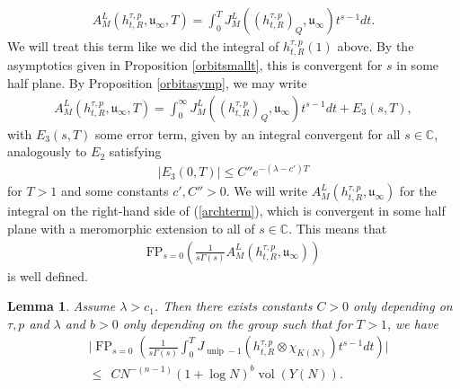 \documentclass[11pt,reqno]{amsart}
\numberwithin{equation}{section}
\newtheorem{lem}[thm]{Lemma}
\theoremstyle{definition}
\theoremstyle{remark}
\newcommand{\vol}{\operatorname{vol}}
\newcommand{\unip}{\operatorname{unip}}
\newcommand{\FP}{\operatorname{FP}}
\newcommand{\mf}[1]{\mathfrak{#1}}
\newcommand{\C}{\mathbb{C}}
\begin{document}
\begin{align*}
    A_M^{L}(h^{\tau,p}_{t,R},\mf{u}_\infty,T) = \int_0^T J^L_M((h^{\tau,p}_{t,R})_Q,\mf{u}_\infty)t^{s-1}dt.
\end{align*}
We will treat this term like we did the integral of $h^{\tau,p}_{t,R}(1)$ above. By the asymptotics given in Proposition \ref{orbitsmallt}, this is convergent for $s$ in some half plane. By Proposition \ref{orbitasymp}, we may write
\begin{align}\label{archterm}
    A_M^{L}(h^{\tau,p}_{t,R},\mf{u}_\infty,T) = \int_0^\infty J^L_M((h^{\tau,p}_{t,R})_Q,\mf{u}_\infty)t^{s-1}dt+E_3(s,T),
\end{align}
with $E_3(s,T)$ some error term, given by an integral convergent for all $s\in\C$, analogously to $E_2$ satisfying
\begin{align}\label{error3}
    |E_3(0,T)|\leq C'' e^{-(\lambda-c') T} 
\end{align}
for $T> 1$ and some constants $c',C''>0$. We will write $A_M^{L}(h^{\tau,p}_{t,R},\mf{u}_\infty)$ for the integral on the right-hand side of (\ref{archterm}), which is convergent in some half plane with a meromorphic extension to all of $s\in\C$. This means that
\begin{align*}
    \text{FP}_{s=0}\left(\frac{1}{s\Gamma(s)}A_M^{L}(h^{\tau,p}_{t,R},\mf{u}_\infty)\right)
\end{align*}
is well defined. 
\begin{lem}\label{unip-1bound}
    Assume $\lambda > c_1$. Then there exists constants $C>0$ only depending on $\tau,p$ and $\lambda$ and $b>0$ only depending on the group such that for $T> 1$, we have
    \begin{align*}
    &\Bigg\vert\FP_{s=0}\left(\frac{1}{s\Gamma(s)}\int_0^T J_{\unip-1}(h^{\tau,p}_{t,R}\otimes \chi_{K(N)})t^{s-1}dt\right)\Bigg\vert  \\
    &\leq\:\: C N^{-(n-1)}(1+\log N)^b \vol(Y(N)).
\end{align*}
\end{lem}
\end{document}
